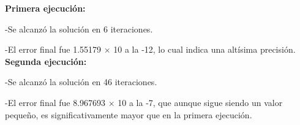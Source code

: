 \textbf{Primera ejecución:}

-Se alcanzó la solución en 6 iteraciones.

-El error final fue 1.55179 × 10 a la -12, lo cual indica una altísima precisión.
\textbf{Segunda ejecución:}

-Se alcanzó la solución en 46 iteraciones.

-El error final fue 8.967693 × 10 a la -7, que aunque sigue siendo un valor pequeño, es significativamente mayor que en la primera ejecución.